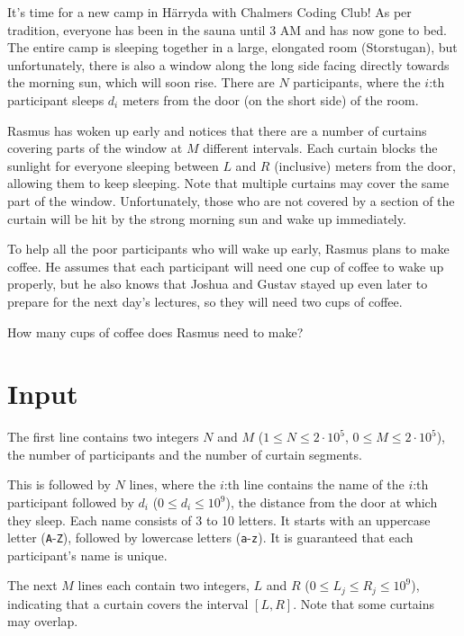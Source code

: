 \noindent

It's time for a new camp in Härryda with Chalmers Coding Club! As per tradition, everyone has been in
the sauna until 3 AM and has now gone to bed. The entire camp is sleeping together in a large, elongated
room (Storstugan), but unfortunately, there is also a window along the long side facing directly towards
the morning sun, which will soon rise. There are $N$ participants, where the $i$:th participant sleeps
$d_i$ meters from the door (on the short side) of the room.


Rasmus has woken up early and notices that there are a number of curtains covering parts of the window
at $M$ different intervals. Each curtain blocks the sunlight for everyone sleeping between $L$ and $R$ (inclusive)
meters from the door, allowing them to keep sleeping. Note that multiple curtains may cover the same part of the window.
Unfortunately, those who are not covered by a section of the curtain will be hit by the strong morning sun and wake up immediately.

To help all the poor participants who will wake up early, Rasmus plans to make coffee. He assumes that each participant will
need one cup of coffee to wake up properly, but he also knows that Joshua and Gustav stayed up even later to prepare
for the next day's lectures, so they will need two cups of coffee.

How many cups of coffee does Rasmus need to make?

\section*{Input}
The first line contains two integers $N$ and $M$ ($1 \leq N \leq 2 \cdot 10^5$, $0 \leq M \leq 2 \cdot 10^5$),
the number of participants and the number of curtain segments.

This is followed by $N$ lines, where the $i$:th line contains the name of the $i$:th participant followed by $d_i$ ($0 \leq d_i \leq 10^9$),
the distance from the door at which they sleep. Each name consists of 3 to 10 letters. It starts with an uppercase letter (\texttt{A}-\texttt{Z}),
followed by lowercase letters (\texttt{a}-\texttt{z}). It is guaranteed that each participant's name is unique.

The next $M$ lines each contain two integers, $L$ and $R$ ($0 \le L_j \le R_j \le 10^9$), indicating that a curtain covers the interval $[L, R]$.
Note that some curtains may overlap.

